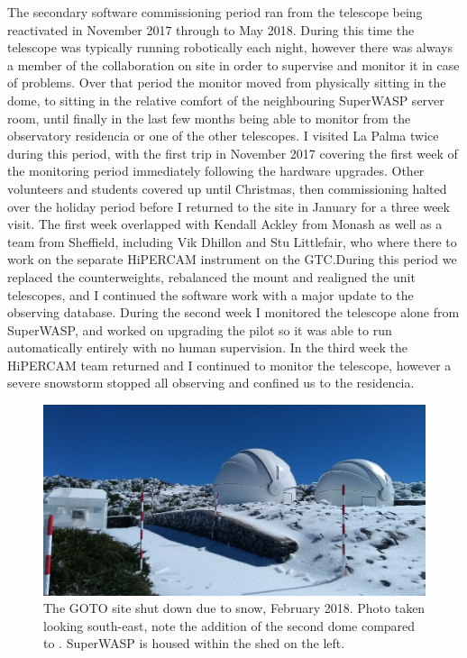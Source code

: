 \begin{colsection}
\begin{colsection}
The secondary software commissioning period ran from the telescope being reactivated in November 2017 through to May 2018. During this time the telescope was typically running robotically each night, however there was always a member of the collaboration on site in order to supervise and monitor it in case of problems. Over that period the monitor moved from physically sitting in the dome, to sitting in the relative comfort of the neighbouring SuperWASP server room, until finally in the last few months being able to monitor from the observatory residencia or one of the other telescopes. I visited La Palma twice during this period, with the first trip in November 2017 covering the first week of the monitoring period immediately following the hardware upgrades. Other volunteers and students covered up until Christmas, then commissioning halted over the holiday period before I returned to the site in January for a three week visit. The first week overlapped with Kendall Ackley from Monash as well as a team from Sheffield, including Vik Dhillon and Stu Littlefair, who where there to work on the separate HiPERCAM instrument on the GTC.\@ During this period we replaced the counterweights, rebalanced the mount and realigned the unit telescopes, and I continued the software work with a major update to the observing database. During the second week I monitored the telescope alone from SuperWASP, and worked on upgrading the pilot so it was able to run automatically entirely with no human supervision. In the third week the HiPERCAM team returned and I continued to monitor the telescope, however a severe snowstorm stopped all observing and confined us to the residencia.

\begin{figure}[t]
    \begin{center}
        \includegraphics[width=\textwidth]{images/snow_photo.jpg}
    \end{center}
    \caption[The GOTO site shut down due to snow]{
        The GOTO site shut down due to snow, February 2018. Photo taken looking south-east, note the addition of the second dome compared to . SuperWASP is housed within the shed on the left.
    }\label{fig:snow}
\end{figure}


\end{colsection}
\end{colsection}
